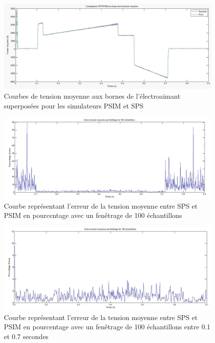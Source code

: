 \documentclass[11pt,letterpaper,final]{report}
\begin{document}
\begin{figure}[h!]
\centering
\includegraphics[scale=0.4]{fig/tmoyPSIM_sim.jpg}
\caption{Courbes de tension moyenne aux bornes de l'électroaimant superposées pour les simulateurs PSIM et SPS}
\label{moyt}
\end{figure}
\begin{figure}[h!]
\centering
\includegraphics[scale=0.4]{fig/erre_ten_fen.jpg}
\caption{Courbe représentant l'erreur de la tension moyenne entre SPS et PSIM en pourcentage avec un fenêtrage de 100 échantillons}
\label{err_ten}
\end{figure}
\begin{figure}[h!]
\centering
\includegraphics[scale=0.4]{fig/err_ten_imp.jpg}
\caption{Courbe représentant l'erreur de la tension moyenne entre SPS et PSIM en pourcentage avec un fenêtrage de 100 échantillons entre 0.1 et 0.7 secondes}
\label{err_ten_imp}
\end{figure}
\end{document}

